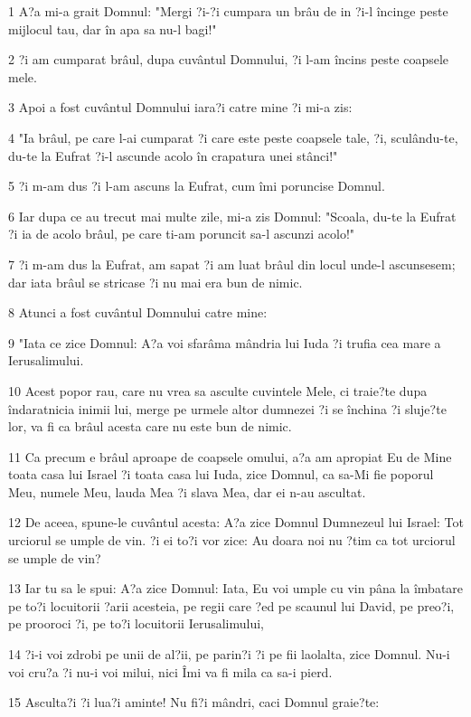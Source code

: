 \par 1 A?a mi-a grait Domnul: "Mergi ?i-?i cumpara un brâu de in ?i-l încinge peste mijlocul tau, dar în apa sa nu-l bagi!"
\par 2 ?i am cumparat brâul, dupa cuvântul Domnului, ?i l-am încins peste coapsele mele.
\par 3 Apoi a fost cuvântul Domnului iara?i catre mine ?i mi-a zis:
\par 4 "Ia brâul, pe care l-ai cumparat ?i care este peste coapsele tale, ?i, sculându-te, du-te la Eufrat ?i-l ascunde acolo în crapatura unei stânci!"
\par 5 ?i m-am dus ?i l-am ascuns la Eufrat, cum îmi poruncise Domnul.
\par 6 Iar dupa ce au trecut mai multe zile, mi-a zis Domnul: "Scoala, du-te la Eufrat ?i ia de acolo brâul, pe care ti-am poruncit sa-l ascunzi acolo!"
\par 7 ?i m-am dus la Eufrat, am sapat ?i am luat brâul din locul unde-l ascunsesem; dar iata brâul se stricase ?i nu mai era bun de nimic.
\par 8 Atunci a fost cuvântul Domnului catre mine:
\par 9 "Iata ce zice Domnul: A?a voi sfarâma mândria lui Iuda ?i trufia cea mare a Ierusalimului.
\par 10 Acest popor rau, care nu vrea sa asculte cuvintele Mele, ci traie?te dupa îndaratnicia inimii lui, merge pe urmele altor dumnezei ?i se închina ?i sluje?te lor, va fi ca brâul acesta care nu este bun de nimic.
\par 11 Ca precum e brâul aproape de coapsele omului, a?a am apropiat Eu de Mine toata casa lui Israel ?i toata casa lui Iuda, zice Domnul, ca sa-Mi fie poporul Meu, numele Meu, lauda Mea ?i slava Mea, dar ei n-au ascultat.
\par 12 De aceea, spune-le cuvântul acesta: A?a zice Domnul Dumnezeul lui Israel: Tot urciorul se umple de vin. ?i ei to?i vor zice: Au doara noi nu ?tim ca tot urciorul se umple de vin?
\par 13 Iar tu sa le spui: A?a zice Domnul: Iata, Eu voi umple cu vin pâna la îmbatare pe to?i locuitorii ?arii acesteia, pe regii care ?ed pe scaunul lui David, pe preo?i, pe prooroci ?i, pe to?i locuitorii Ierusalimului,
\par 14 ?i-i voi zdrobi pe unii de al?ii, pe parin?i ?i pe fii laolalta, zice Domnul. Nu-i voi cru?a ?i nu-i voi milui, nici Îmi va fi mila ca sa-i pierd.
\par 15 Asculta?i ?i lua?i aminte! Nu fi?i mândri, caci Domnul graie?te:
